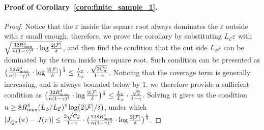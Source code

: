 \documentclass[twoside]{article}
\newcommand{\CAL}[1]{\mathcal{#1}}
\begin{document}
\paragraph{Proof of Corollary~\ref{coro:finite_sample_1}.}
\begin{proof}
 Notice that the $\varepsilon$ inside the square root always dominates the $\varepsilon$ outside with $\varepsilon$ small enough, therefore, we prove the corollary by
    substituting $L_\CAL{E}\varepsilon$ with $\sqrt{\frac{32R_{\rm max}^4}{n(1-\gamma)^4}\cdot\log\frac{2|\mathcal{F}|}{\delta}}$, and then find the condition that the out side $L_\phi\varepsilon$ can be dominated by the term inside the square root. Such condition can be presented as $\big(\frac{32R_{\rm max}^4}{n(1-\gamma)^4}\cdot\log\frac{2|\mathcal{F}|}{\delta}\big)^{\frac{1}{4}}\leq \frac{L_{\CAL{E}}}{L_\phi}\cdot \frac{\sqrt{2C_\pi^n}}{1-\gamma}$.
    Noticing that the coverage term is generally increasing, and is always bounded below by $1$, we therefore provide a sufficient condition as
    $\big(\frac{32R_{\rm max}^4}{n(1-\gamma)^4}\cdot\log\frac{2|\mathcal{F}|}{\delta}\big)^{\frac{1}{4}}\leq \frac{L_{\CAL{E}}}{L_\phi}\cdot \frac{\sqrt{2}}{1-\gamma}$. Solving it gives us the condition $n\geq 8R_{\rm max}^4(L_\phi/L_\CAL{E})^4\log(2|\CAL{F}|/\delta)$, under which $|J_{\hat{Q}^\pi}(\pi)-J(\pi)|\leq\frac{2\sqrt{C_\pi^n}}{1-\gamma}\cdot
        \big(\frac{128R_{\rm max}^4}{n(1-\gamma)^4}\cdot\log\frac{2|\mathcal{F}|}{\delta}\big)^{\frac{1}{4}}$.
\end{proof}
\end{document}
